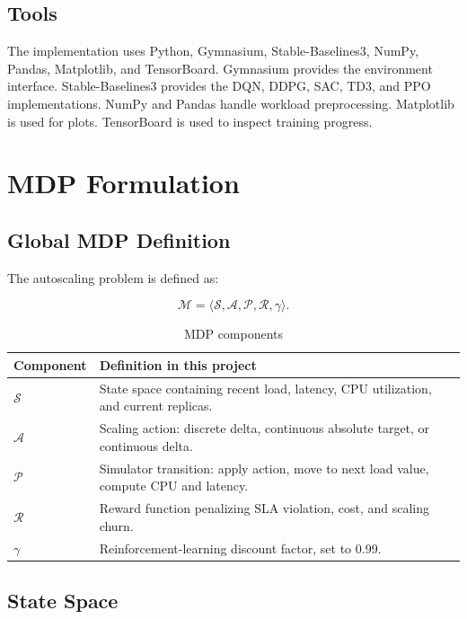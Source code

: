 \documentclass{rapportINPTCLOUD}
\begin{document}
\section{Tools}

The implementation uses Python, Gymnasium, Stable-Baselines3, NumPy, Pandas, Matplotlib, and TensorBoard. Gymnasium provides the environment interface. Stable-Baselines3 provides the DQN, DDPG, SAC, TD3, and PPO implementations. NumPy and Pandas handle workload preprocessing. Matplotlib is used for plots. TensorBoard is used to inspect training progress.

\chapter{MDP Formulation}
\label{chap:mdp}

\section{Global MDP Definition}

The autoscaling problem is defined as:

\begin{equation}
\mathcal{M} = \langle \mathcal{S}, \mathcal{A}, \mathcal{P}, \mathcal{R}, \gamma \rangle .
\end{equation}

\begin{table}[H]
\centering
\begin{tabularx}{\textwidth}{lY}
\toprule
\textbf{Component} & \textbf{Definition in this project} \\
\midrule
$\mathcal{S}$ & State space containing recent load, latency, CPU utilization, and current replicas. \\
$\mathcal{A}$ & Scaling action: discrete delta, continuous absolute target, or continuous delta. \\
$\mathcal{P}$ & Simulator transition: apply action, move to next load value, compute CPU and latency. \\
$\mathcal{R}$ & Reward function penalizing SLA violation, cost, and scaling churn. \\
$\gamma$ & Reinforcement-learning discount factor, set to 0.99. \\
\bottomrule
\end{tabularx}
\caption{MDP components}
\end{table}

\section{State Space}
\end{document}
